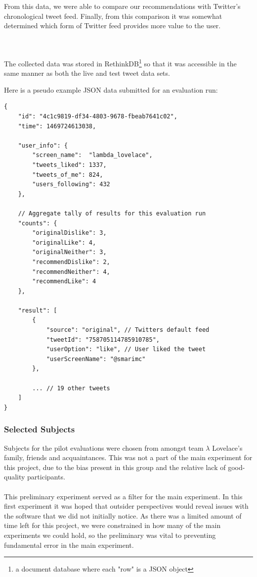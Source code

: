 \documentclass{article}
\begin{document}
From this data, we were able to compare our recommendations with Twitter's chronological tweet feed. Finally, from this comparison it was somewhat determined which form of Twitter feed provides more value to the user. 

\\\\


The collected data was stored in RethinkDB\footnote{a document database where each "row" is a JSON object} so that it was accessible in the same manner as both the live and test tweet data sets.


\begin{samepage}
\noindent Here is a pseudo example JSON data submitted for an evaluation run:
\begin{verbatim}
{
    "id": "4c1c9819-df34-4803-9678-fbeab7641c02",
    "time": 1469724613038,
    
    "user_info": {
        "screen_name":  "lambda_lovelace",
        "tweets_liked": 1337,
        "tweets_of_me": 824,
        "users_following": 432
    },

    // Aggregate tally of results for this evaluation run
    "counts": {
        "originalDislike": 3,
        "originalLike": 4,
        "originalNeither": 3,
        "recommendDislike": 2,
        "recommendNeither": 4,
        "recommendLike": 4
    },
    
    "result": [
        {
            "source": "original", // Twitters default feed
            "tweetId": "758705114785910785",
            "userOption": "like", // User liked the tweet
            "userScreenName": "@smarimc"
        },
        
        ... // 19 other tweets
    ]
}
\end{verbatim}
\end{samepage}

\subsubsection*{Selected Subjects} 





Subjects for the pilot evaluations were chosen from amongst team $\lambda$ Lovelace's family, friends and acquaintances. This was not a part of the main experiment for this project, due to the bias present in this group and the relative lack of good-quality participants.
\\\\
This preliminary experiment served as a filter for the main experiment. In this first experiment it was hoped that outsider perspectives would reveal issues with the software that we did not initially notice. As there was a limited amount of time left for this project, we were constrained in how many of the main experiments we could hold, so the preliminary was vital to preventing fundamental error in the main experiment. 
\end{document}
